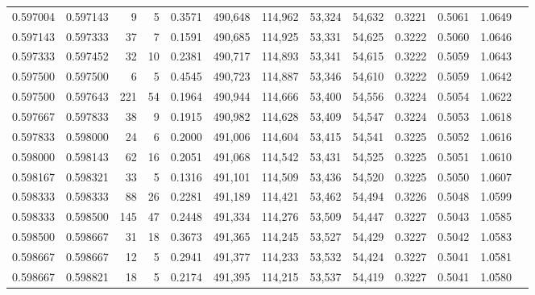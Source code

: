 \begin{tabular}{rrrrrrrrrrrrr}
0.597004 & 0.597143 &     9 &   5 &                                     0.3571 & 490,648 & 114,962 &  53,324 &  54,632 & 0.3221 & 0.5061 & 1.0649 \\
0.597143 & 0.597333 &    37 &   7 &                                     0.1591 & 490,685 & 114,925 &  53,331 &  54,625 & 0.3222 & 0.5060 & 1.0646 \\
0.597333 & 0.597452 &    32 &  10 &                                     0.2381 & 490,717 & 114,893 &  53,341 &  54,615 & 0.3222 & 0.5059 & 1.0643 \\
0.597500 & 0.597500 &     6 &   5 &                                     0.4545 & 490,723 & 114,887 &  53,346 &  54,610 & 0.3222 & 0.5059 & 1.0642 \\
0.597500 & 0.597643 &   221 &  54 &                                     0.1964 & 490,944 & 114,666 &  53,400 &  54,556 & 0.3224 & 0.5054 & 1.0622 \\
0.597667 & 0.597833 &    38 &   9 &                                     0.1915 & 490,982 & 114,628 &  53,409 &  54,547 & 0.3224 & 0.5053 & 1.0618 \\
0.597833 & 0.598000 &    24 &   6 &                                     0.2000 & 491,006 & 114,604 &  53,415 &  54,541 & 0.3225 & 0.5052 & 1.0616 \\
0.598000 & 0.598143 &    62 &  16 &                                     0.2051 & 491,068 & 114,542 &  53,431 &  54,525 & 0.3225 & 0.5051 & 1.0610 \\
0.598167 & 0.598321 &    33 &   5 &                                     0.1316 & 491,101 & 114,509 &  53,436 &  54,520 & 0.3225 & 0.5050 & 1.0607 \\
0.598333 & 0.598333 &    88 &  26 &                                     0.2281 & 491,189 & 114,421 &  53,462 &  54,494 & 0.3226 & 0.5048 & 1.0599 \\
0.598333 & 0.598500 &   145 &  47 &                                     0.2448 & 491,334 & 114,276 &  53,509 &  54,447 & 0.3227 & 0.5043 & 1.0585 \\
0.598500 & 0.598667 &    31 &  18 &                                     0.3673 & 491,365 & 114,245 &  53,527 &  54,429 & 0.3227 & 0.5042 & 1.0583 \\
0.598667 & 0.598667 &    12 &   5 &                                     0.2941 & 491,377 & 114,233 &  53,532 &  54,424 & 0.3227 & 0.5041 & 1.0581 \\
0.598667 & 0.598821 &    18 &   5 &                                     0.2174 & 491,395 & 114,215 &  53,537 &  54,419 & 0.3227 & 0.5041 & 1.0580 \\

\end{tabular}
